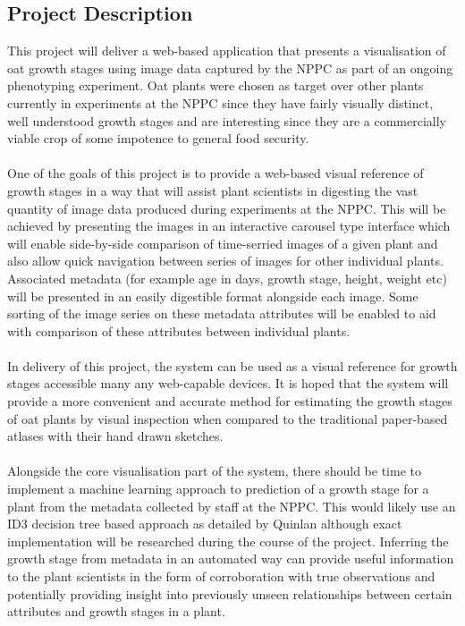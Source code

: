 \documentclass[11pt,fleqn,twoside]{article}
\begin{document}
\subsection{Project Description}
This project will deliver a web-based application that presents a visualisation of oat growth stages using image data captured by the NPPC as part of an ongoing phenotyping experiment. Oat plants were chosen as target over other plants currently in experiments at the NPPC since they have fairly visually distinct, well understood growth stages and are interesting since they are a commercially viable crop of some impotence to general food security. 
\\\\
One of the goals of this project is to provide a web-based visual reference of growth stages in a way that will assist plant scientists in digesting the vast quantity of image data produced during experiments at the NPPC. This will be achieved by presenting the images in an interactive carousel type interface which will enable side-by-side comparison of time-serried images of a given plant and also allow quick navigation between series of images for other individual plants. Associated metadata (for example age in days, growth stage, height, weight etc) will be presented in an easily digestible format alongside each image. Some sorting of the image series on these metadata attributes will be enabled to aid with comparison of these attributes between individual plants.
\\\\
In delivery of this project, the system can be used as a visual reference for growth stages accessible many any web-capable devices. It is hoped that the system will provide a more convenient and accurate method for estimating the growth stages of oat plants by visual inspection when compared to the traditional paper-based atlases with their hand drawn sketches.
\\\\
Alongside the core visualisation part of the system, there should be time to implement a machine learning approach to prediction of a growth stage for a plant from the metadata collected by staff at the NPPC. This would likely use an ID3 decision tree based approach as detailed by Quinlan \cite{id3} although exact implementation will be researched during the course of the project. Inferring the growth stage from metadata in an automated way can provide useful information to the plant scientists in the form of corroboration with true observations and potentially providing insight into previously unseen relationships between certain attributes and growth stages in a plant. 
\end{document}
